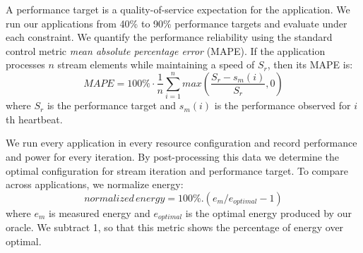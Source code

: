 A performance target is a quality-of-service expectation for the
application. We run our applications from 40\% to 90\% performance
targets and evaluate \SYSTEM{} under each constraint. We quantify the
performance reliability using the standard control metric \emph{mean
  absolute percentage error} (MAPE).  If the application processes $n$
stream elements while maintaining a speed of $S_r$, then its MAPE is:
\begin{equation}
MAPE = 100\% \cdot \frac{1}{n} \sum\limits_{i=1}^{n} max \left( \frac{S_{r} - s_m(i)}{S_r},0 \right)
\end{equation}
where $S_{r}$ is the performance target and $s_m(i)$ is the
performance observed for $i$th heartbeat.


We run every application in every resource configuration and record
performance and power for every iteration.  By post-processing this
data we determine the optimal configuration for stream iteration and
performance target. To compare across applications, we normalize
energy:
\begin{equation}
  normalized\,energy = 100\% . (e_m / e_{optimal} - 1)
\end{equation}
where $e_m$ is measured energy and $e_{optimal}$ is the optimal energy
produced by our oracle. We subtract 1, so that this metric shows the
percentage of energy over optimal.  


